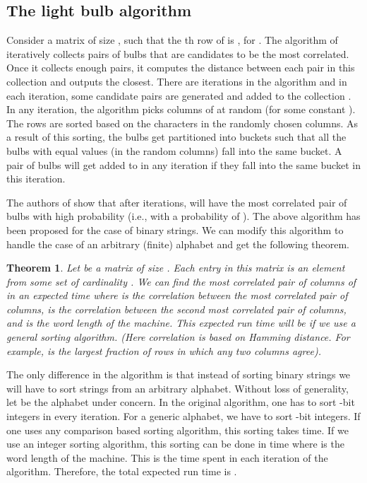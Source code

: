 \documentclass{article}
\newtheorem{theorem}{Theorem}[section]
\theoremstyle{definition}
\theoremstyle{remark}
\begin{document}
\subsection{The light bulb algorithm}
Consider a matrix  of size , such that the th row of  is , for . The algorithm of \cite{RSJ89} iteratively collects pairs of bulbs that are candidates to be the most correlated. Once it collects enough pairs, it computes the distance between each pair in this collection and outputs the closest. There are  iterations in the algorithm and in each iteration, some candidate pairs are generated and added to the collection . In any iteration, the algorithm picks  columns of  at random (for some constant ). The rows are sorted based on the characters in the randomly chosen columns. As a result of this sorting, the bulbs get partitioned into buckets such that all the bulbs with equal values (in the  random columns) fall into the same bucket. A pair of bulbs  will get added to  in any iteration if they fall into the same bucket in this iteration.

The authors of \cite{RSJ89} show that after  iterations,  will have the most correlated pair of bulbs with high probability (i.e., with a probability of ). The above algorithm has been proposed for the case of binary strings. We can modify this algorithm to handle the case of an arbitrary (finite) alphabet and get the following theorem.

\begin{theorem}\label{theorem0}
Let  be a matrix of size . Each entry in this matrix is an element from some set  of cardinality . We can find the most correlated pair of columns of  in an expected  time where  is the correlation between the most correlated pair of columns,  is the correlation between the second most correlated pair of columns, and  is the word length of the machine.  This expected run time will be  if we use a general sorting algorithm. (Here correlation is based on Hamming distance. For example,  is the largest fraction of rows in which any two columns agree).
\end{theorem}



 The only difference in the algorithm is that instead of sorting binary strings we will have to sort strings from an arbitrary alphabet. Without loss of generality, let  be the alphabet under concern. In the original algorithm, one has to sort  -bit integers in every iteration. For a generic alphabet, we have to sort  -bit integers. If one uses any comparison based sorting algorithm, this sorting takes  time. If we use an integer sorting algorithm, this sorting can be done in  time where  is the word length of the machine. This is the time spent in each iteration of the algorithm. Therefore, the total expected run time is . 
\end{document}
